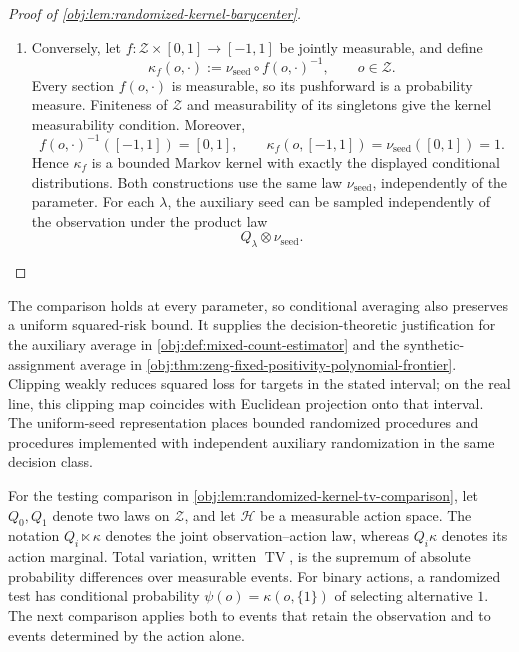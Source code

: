 \documentclass[11pt]{article}
\begin{document}
\begin{proof}[Proof of \cref{obj:lem:randomized-kernel-barycenter}]
\begin{enumerate}
\item Conversely, let \(f:\mathcal Z\times[0,1]\to[-1,1]\) be jointly
measurable, and define
\[
\kappa_f(o,\cdot)
:=
\nu_{\mathrm{seed}}\circ f(o,\cdot)^{-1},
\qquad o\in\mathcal Z.
\]
Every section \(f(o,\cdot)\) is measurable, so its pushforward is a probability
measure. Finiteness of \(\mathcal Z\) and measurability of its singletons give
the kernel measurability condition. Moreover,
\[
f(o,\cdot)^{-1}([-1,1])=[0,1],
\qquad
\kappa_f(o,[-1,1])
=\nu_{\mathrm{seed}}([0,1])=1.
\]
Hence \(\kappa_f\) is a bounded Markov kernel with exactly the displayed
conditional distributions. Both constructions use the same law
\(\nu_{\mathrm{seed}}\), independently of the parameter. For each
\(\lambda\), the auxiliary seed can be sampled independently of the
observation under the product law
\[
Q_\lambda\otimes\nu_{\mathrm{seed}}.
\]
\end{enumerate}
\end{proof}

The comparison holds at every parameter, so conditional averaging also preserves a uniform squared-risk bound. It supplies the decision-theoretic justification for the auxiliary average in \cref{obj:def:mixed-count-estimator} and the synthetic-assignment average in \cref{obj:thm:zeng-fixed-positivity-polynomial-frontier}. Clipping weakly reduces squared loss for targets in the stated interval; on the real line, this clipping map coincides with Euclidean projection onto that interval. The uniform-seed representation places bounded randomized procedures and procedures implemented with independent auxiliary randomization in the same decision class.

For the testing comparison in \cref{obj:lem:randomized-kernel-tv-comparison}, let \(Q_0,Q_1\) denote two laws on \(\mathcal Z\), and let \(\mathcal H\) be a measurable action space. The notation \(Q_i\ltimes\kappa\) denotes the joint observation--action law, whereas \(Q_i\kappa\) denotes its action marginal. Total variation, written \(\operatorname{TV}\), is the supremum of absolute probability differences over measurable events. For binary actions, a randomized test has conditional probability \(\psi(o)=\kappa(o,\{1\})\) of selecting alternative \(1\). The next comparison applies both to events that retain the observation and to events determined by the action alone.
\end{document}
